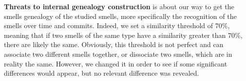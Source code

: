 {\color{blue}
\textbf{Threats to internal genealogy construction} is about our way to get the smells genealogy of the studied smells, more specifically the recognition of the smells over time and commits. Indeed, we set a similarity threshold of 70\%, meaning that if two smells of the same type have a similarity greater than 70\%, there are likely the same. Obviously, this threshold is not perfect and can associate two different smells together, or dissociate two smells, which are in reality the same. However, we changed it in order to see if some significant differences would appear, but no relevant difference was revealed.
	
}
